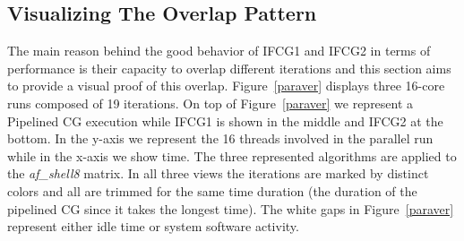 \begin{table}[bhtp]
\centering
\fontsize{9}{9}\selectfont
{}
\vspace{0.2cm}
\caption{Iteration counts of all considered methods and matrices. \emph{FUSE} = 20 for IFCG1 and IFCG2}
\label{table:iterations}
\vspace{-0.5cm}
\end{table}

\subsection{Visualizing The Overlap Pattern}
\label{sec:ifcg_visualization}
The main reason behind the good behavior of IFCG1 and IFCG2 in terms of performance is their capacity to overlap different iterations and 
this section aims to provide a visual proof of this overlap.
Figure~\ref{paraver} displays three 16-core runs composed of 19 iterations.
On top of Figure~\ref{paraver} we represent a Pipelined CG execution while IFCG1 is shown in the middle and IFCG2 at the bottom.
In the y-axis we represent the 16 threads involved in the parallel run while in the x-axis we show time.
The three represented algorithms are applied to the \textit{af\_shell8} matrix.
In all three views the iterations are marked by distinct colors and all are trimmed for the same
time duration (the duration of the pipelined CG since it takes the longest time).
The white gaps in Figure~\ref{paraver} represent either idle time or system software activity.


